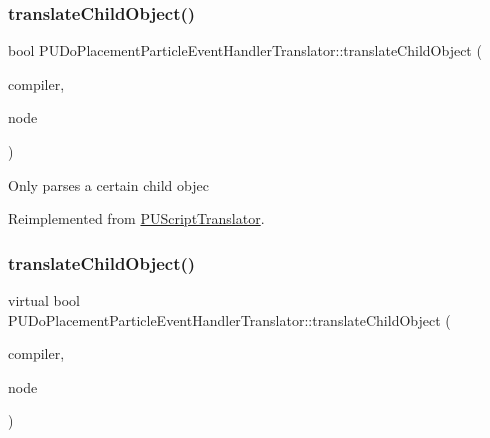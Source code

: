 \subsubsection{\texorpdfstring{translate\+Child\+Object()}{translateChildObject()}\hspace{0.1cm}{\footnotesize\ttfamily [1/2]}}
{\footnotesize\ttfamily bool P\+U\+Do\+Placement\+Particle\+Event\+Handler\+Translator\+::translate\+Child\+Object (\begin{DoxyParamCaption}\item[{\hyperlink{classPUScriptCompiler}{P\+U\+Script\+Compiler} $\ast$}]{compiler,  }\item[{\hyperlink{classPUAbstractNode}{P\+U\+Abstract\+Node} $\ast$}]{node }\end{DoxyParamCaption})\hspace{0.3cm}{\ttfamily [virtual]}}

Only parses a certain child objec 

Reimplemented from \hyperlink{classPUScriptTranslator_ab587d01348ae3e678cb700c719b2b113}{P\+U\+Script\+Translator}.

\mbox{\label{classPUDoPlacementParticleEventHandlerTranslator_a46adc0dbc1cddfb761d635f66fa2cbd0}} 
\subsubsection{\texorpdfstring{translate\+Child\+Object()}{translateChildObject()}\hspace{0.1cm}{\footnotesize\ttfamily [2/2]}}
{\footnotesize\ttfamily virtual bool P\+U\+Do\+Placement\+Particle\+Event\+Handler\+Translator\+::translate\+Child\+Object (\begin{DoxyParamCaption}\item[{\hyperlink{classPUScriptCompiler}{P\+U\+Script\+Compiler} $\ast$}]{compiler,  }\item[{\hyperlink{classPUAbstractNode}{P\+U\+Abstract\+Node} $\ast$}]{node }\end{DoxyParamCaption})\hspace{0.3cm}{\ttfamily [virtual]}}

